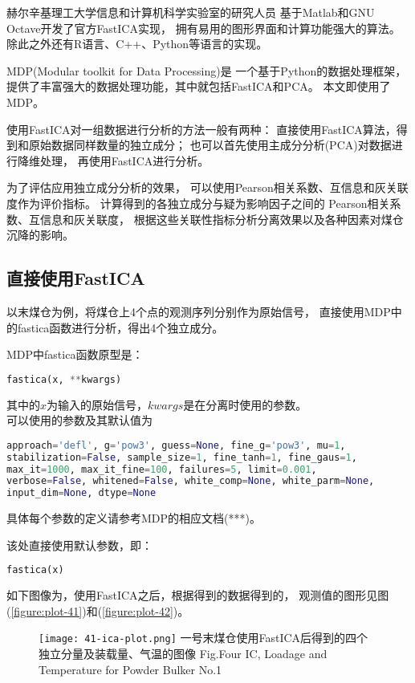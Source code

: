 赫尔辛基理工大学信息和计算机科学实验室的研究人员
基于Matlab和GNU Octave开发了官方FastICA实现，
拥有易用的图形界面和计算功能强大的算法。
除此之外还有R语言、C++、Python等语言的实现。

MDP(Modular toolkit for Data Processing)是
一个基于Python的数据处理框架，
提供了丰富强大的数据处理功能，其中就包括FastICA和PCA。
本文即使用了MDP。

使用FastICA对一组数据进行分析的方法一般有两种：
直接使用FastICA算法，得到和原始数据同样数量的独立成分；
也可以首先使用主成分分析(PCA)对数据进行降维处理，
再使用FastICA进行分析。   

为了评估应用独立成分分析的效果，
可以使用Pearson相关系数、互信息和灰关联度作为评价指标。
计算得到的各独立成分与疑为影响因子之间的
Pearson相关系数、互信息和灰关联度，
根据这些关联性指标分析分离效果以及各种因素对煤仓沉降的影响。

\subsection{直接使用FastICA}
以末煤仓为例，将煤仓上4个点的观测序列分别作为原始信号，
直接使用MDP中的fastica函数进行分析，得出4个独立成分。

MDP中fastica函数原型是：
\begin{lstlisting}[language=Python, basicstyle=\ttfamily]
fastica(x, **kwargs)
\end{lstlisting}
其中的$x$为输入的原始信号，$kwargs$是在分离时使用的参数。\\
可以使用的参数及其默认值为
\begin{lstlisting}[language=Python, basicstyle=\ttfamily]
approach='defl', g='pow3', guess=None, fine_g='pow3', mu=1, 
stabilization=False, sample_size=1, fine_tanh=1, fine_gaus=1,
max_it=1000, max_it_fine=100, failures=5, limit=0.001, 
verbose=False, whitened=False, white_comp=None, white_parm=None,
input_dim=None, dtype=None
\end{lstlisting}
具体每个参数的定义请参考MDP的相应文档(***)。

该处直接使用默认参数，即：
\begin{lstlisting}[language=Python, basicstyle=\ttfamily]
fastica(x)
\end{lstlisting}
如下图像为，使用FastICA之后，根据得到的数据得到的，
观测值的图形见图(\ref{figure:plot-41})和(\ref{figure:plot-42})。

\begin{figure}[!h]
   \centering
   \texttt{[image: 41-ica-plot.png]}
				    {一号末煤仓使用FastICA后得到的四个独立分量及装载量、气温的图像}
			{Fig.}{Four IC, Loadage and Temperature for Powder Bulker No.1}
\end{figure}

